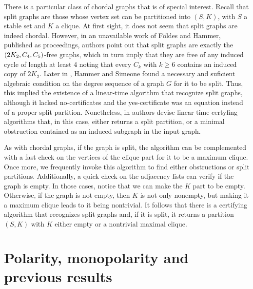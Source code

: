 There is a particular class of chordal graphs that is of special interest.
Recall that split graphs are those whose vertex set can be partitioned into
$(S,K)$, with $S$ a stable set and $K$ a clique. At first sight, it does not
seem that split graphs are indeed chordal. However, in an unavailable work of
F\"oldes and Hammer, published as proceedings, authors point out that split
graphs are exactly the $\left(2K_2,C_4,C_5\right)$-free graphs, which in turn imply that
they are free of any induced cycle of length at least 4 noting that every $C_k$
with $k\geq 6$ contains an induced copy of $2K_2$. Later in \cite{hammer1981},
Hammer and Simeone found a necessary and suficient algebraic condition on the
degree sequence of a graph $G$ for it to be split. Thus, this implied the
existence of a linear-time algorithm that recognize split graphs, although it
lacked no-certificates and the yes-certificate was an equation instead of a
proper split partition. Nonetheless, in \cite{heggernesNJC14,hellDAM141} authors
devise linear-time certyfing algorithms that, in this case, either returns a
split partition, or a minimal obstruction contained as an induced subgraph in
the input graph.

As with chordal graphs, if the graph is split, the algorithm can be complemented
with a fast check on the vertices of the clique part for it to be a maximum
clique. Once more, we frequently invoke this algorithm to find either
obstructions or split partitions. Additionally, a quick check on the adjacency
lists can verify if the graph is empty. In those cases, notice that we can make
the $K$ part to be empty. Otherwise, if the graph is not empty, then $K$ is not
only nonempty, but making it a maximum clique leads to it being nontrivial. It
follows that there is a certifying algorithm that recognizes split graphs and,
if it is split, it returns a partition $(S,K)$ with $K$ either empty or a
nontrivial maximal clique.

\section{Polarity, monopolarity and previous results}
\label{sec:polarity-defs}

